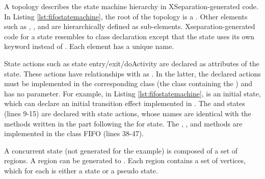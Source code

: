 \vskip 0.2cm
\noindent
{}
A topology describes the state machine hierarchy in XSeparation-generated code.
In Listing \ref{lst:fifostatemachine}, the root of the topology is a .
Other elements such as , , and  are hierarchically defined as sub-elements.
Xseparation-generated code for a state resembles to class declaration except that the state uses its own keyword  instead of .
Each element has a unique name.

State actions such as state entry/exit/doActivity are declared as attributes of the state.
These actions have relationships with  as .
In the latter, the declared actions must be implemented in the corresponding class (the class containing the ) and has no parameter.
For example, in Listing \ref{lst:fifostatemachine},  is an initial state, which can declare an initial transition effect implemented in  . 
The  and  states (lines 9-15) are declared with state actions, whose names are identical with the methods written in the  part following the  for state. 
The , , and  methods are implemented in the class FIFO (lines 38-47).


A concurrent state (not generated for the example) is composed of a set of regions.
A region can be generated to  .
Each region contains a set of vertices, which for each is either a state or a pseudo state.



